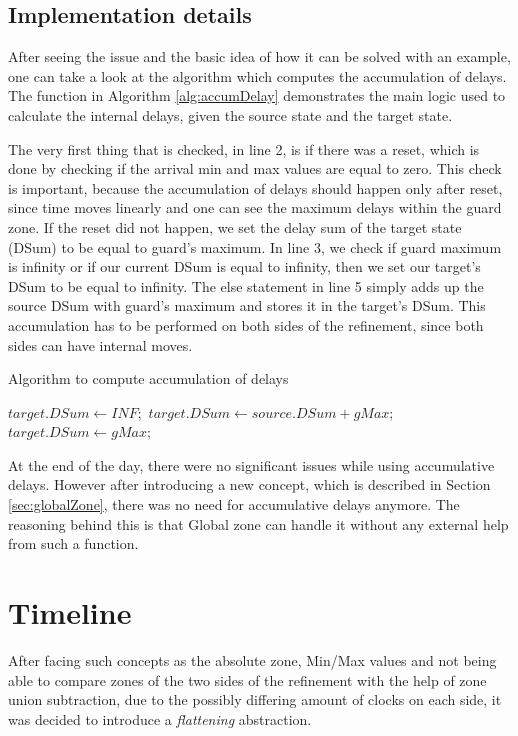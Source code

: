 \subsection{Implementation details}
After seeing the issue and the basic idea of how it can be solved with an example, one can take a look at the algorithm which computes the accumulation of delays. The function in Algorithm \ref{alg:accumDelay} demonstrates the main logic used to calculate the internal delays, given the source state and the target state.

The very first thing that is checked, in line 2, is if there was a reset, which is done by checking if the arrival min and max values are equal to zero. This check is important, because the accumulation of delays should happen only after reset, since time moves linearly and one can see the maximum delays within the guard zone. If the reset did not happen, we set the delay sum of the target state (DSum) to be equal to guard's maximum. In line 3, we check if guard maximum is infinity or if our current DSum is equal to infinity, then we set our target's DSum to be equal to infinity. The else statement in line 5 simply adds up the source DSum with guard's maximum and stores it in the target's DSum. This accumulation has to be performed on both sides of the refinement, since both sides can have internal moves.

\begin{algorithm}
\caption{Algorithm to compute accumulation of delays}
\label{alg:accumDelay}
\begin{algorithmic}[1]
        \State $target.DSum \gets INF;$
    \Else
        \State $target.DSum \gets source.DSum + gMax;$
    \EndIf
\Else 
    \State $target.DSum \gets gMax;$
\EndIf
        
\EndFunction
\end{algorithmic}
\end{algorithm}

At the end of the day, there were no significant issues while using accumulative delays. However after introducing a new concept, which is described in Section \ref{sec:globalZone}, there was no need for accumulative delays anymore. The reasoning behind this is that Global zone can handle it without any external help from such a function. 


\section{Timeline}
After facing such concepts as the absolute zone, Min/Max values and not being able to compare zones of the two sides of the refinement with the help of zone union subtraction, due to the possibly differing amount of clocks on each side, it was decided to introduce a \textit{flattening} abstraction.


